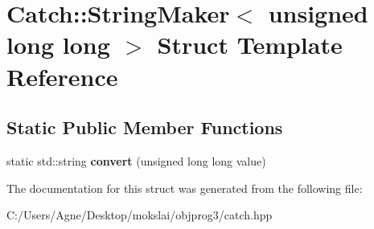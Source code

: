 \hypertarget{struct_catch_1_1_string_maker_3_01unsigned_01long_01long_01_4}{}\section{Catch\+:\+:String\+Maker$<$ unsigned long long $>$ Struct Template Reference}
\label{struct_catch_1_1_string_maker_3_01unsigned_01long_01long_01_4}
\subsection*{Static Public Member Functions}
\begin{DoxyCompactItemize}
\item 
\mbox{\label{struct_catch_1_1_string_maker_3_01unsigned_01long_01long_01_4_a6a8708af4fc8df3f52d7eab779b6bc6f}} 
static std\+::string {\bfseries convert} (unsigned long long value)
\end{DoxyCompactItemize}


The documentation for this struct was generated from the following file\+:\begin{DoxyCompactItemize}
\item 
C\+:/\+Users/\+Agne/\+Desktop/mokslai/objprog3/catch.\+hpp\end{DoxyCompactItemize}
